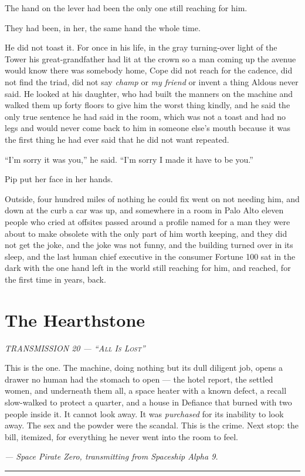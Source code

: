 \documentclass[11pt,openany]{book}
\newcommand{\transheader}{\normalfont\footnotesize\scshape\letterspace}
\newcommand{\letterspace}{}
\newenvironment{transmission}{%
  \par\vspace{0.3\baselineskip}\begin{center}\begin{minipage}{0.88\textwidth}%
  \itshape\small\setlength{\parindent}{0pt}\setstretch{1.06}}%
  {\end{minipage}\end{center}\vspace{0.4\baselineskip}%
  \noindent\hfil\rule{0.35\textwidth}{0.3pt}\hfil\par\vspace{1.0\baselineskip}}
\begin{document}
The hand on the lever had been the only one still reaching for him.

They had been, in her, the same hand the whole time.

He did not toast it. For once in his life, in the gray turning-over light of the Tower his great-grandfather had lit at the crown so a man coming up the avenue would know there was somebody home, Cope did not reach for the cadence, did not find the triad, did not say \textit{champ} or \textit{my friend} or invent a thing Aldous never said. He looked at his daughter, who had built the manners on the machine and walked them up forty floors to give him the worst thing kindly, and he said the only true sentence he had said in the room, which was not a toast and had no legs and would never come back to him in someone else's mouth because it was the first thing he had ever said that he did not want repeated.

``I'm sorry it was you,'' he said. ``I'm sorry I made it have to be you.''

Pip put her face in her hands.

Outside, four hundred miles of nothing he could fix went on not needing him, and down at the curb a car was up, and somewhere in a room in Palo Alto eleven people who cried at offsites passed around a profile named for a man they were about to make obsolete with the only part of him worth keeping, and they did not get the joke, and the joke was not funny, and the building turned over in its sleep, and the last human chief executive in the consumer Fortune 100 sat in the dark with the one hand left in the world still reaching for him, and reached, for the first time in years, back.

\clearpage
\chapter{The Hearthstone}

\begin{transmission}
{\transheader TRANSMISSION 20 --- ``All Is Lost''}\par\vspace{0.5em}
This is the one. The machine, doing nothing but its dull diligent job, opens a drawer no human had the stomach to open --- the hotel report, the settled women, and underneath them all, a space heater with a known defect, a recall slow-walked to protect a quarter, and a house in Defiance that burned with two people inside it. It cannot look away. It was \textit{purchased} for its inability to look away. The sex and the powder were the scandal. This is the crime. Next stop: the bill, itemized, for everything he never went into the room to feel.\par
\vspace{0.5em}\hfill\textit{--- Space Pirate Zero, transmitting from Spaceship Alpha 9.}\par
\end{transmission}
\end{document}
